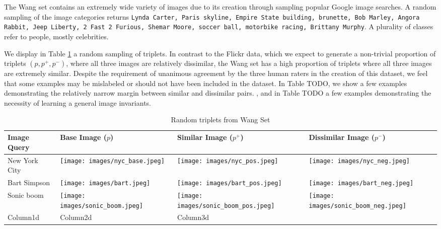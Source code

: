 The Wang set contains an extremely wide variety of images due to its creation through sampling popular Google image searches. A random sampling of the image categories returns \texttt{\justify Lynda Carter, Paris skyline, Empire State building, brunette, Bob Marley, Angora Rabbit, Jeep Liberty, 2 Fast 2 Furious, Shemar Moore, soccer ball, motorbike racing, Brittany Murphy}. A plurality of classes refer to people, mostly celebrities.

We display in Table \ref{table:random_triplets} a random sampling of triplets. In contrast to the Flickr data, which we expect to generate a non-trivial proportion of triplets $(p, p^+, p^-)$, where all three images are relatively dissimilar, the Wang set has a high proportion of triplets where all three images are extremely similar. Despite the requirement of unanimous agreement by the three human raters in the creation of this dataset, we feel that some examples may be mislabeled or should not have been included in the dataset. In Table TODO, we show a few examples demonstrating the relatively narrow margin between similar and dissimilar pairs. , and in Table TODO a few examples demonstrating the necessity of learning a general image invariants.

\begin{table}
	\begin{tabular}{>{\centering\arraybackslash}m{1in} >{\centering\arraybackslash}m{1.4in} >{\centering\arraybackslash}m{1.4in} >{\centering\arraybackslash}m{1.4in}}
		\toprule
		\bfseries Image Query & \bfseries Base Image ($p$) & \bfseries Similar Image ($p^+$) & \bfseries Dissimilar Image ($p^-$) \\
		\midrule
		\centering New York City & \texttt{[image: images/nyc\_base.jpeg]} & \texttt{[image: images/nyc\_pos.jpeg]} & \texttt{[image: images/nyc\_neg.jpeg]}\\
		Bart Simpson & \texttt{[image: images/bart.jpeg]} & \texttt{[image: images/bart\_pos.jpeg]} & \texttt{[image: images/bart\_neg.jpeg]}\\
		Sonic boom & \texttt{[image: images/sonic\_boom.jpeg]} & \texttt{[image: images/sonic\_boom\_pos.jpeg]} & \texttt{[image: images/sonic\_boom\_neg.jpeg]}\\
		Column1d & Column2d & Column3d & \\
		\bottomrule
	\end{tabular}
	\caption{Random triplets from Wang Set}
	\label{table:random_triplets}
\end{table}

